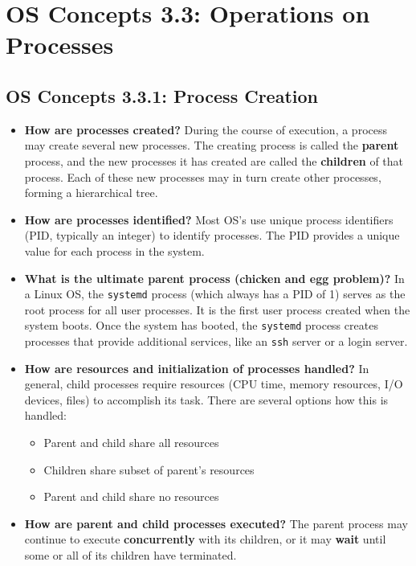 \documentclass[12pt]{article}
\begin{document}
\section*{OS Concepts 3.3: Operations on Processes}

\subsection*{OS Concepts 3.3.1: Process Creation}

\begin{itemize}
    \item \textbf{How are processes created?} During the course of execution, a process may create several new processes. The creating process is called the \textbf{parent} process, and the new processes it has created are called the \textbf{children} of that process. Each of these new processes may in turn create other processes, forming a hierarchical tree.
    \item \textbf{How are processes identified?} Most OS's use unique process identifiers (PID, typically an integer) to identify processes. The PID provides a unique value for each process in the system.
    \item \textbf{What is the ultimate parent process (chicken and egg problem)?} In a Linux OS, the \texttt{systemd} process (which always has a PID of 1) serves as the root process for all user processes. It is the first user process created when the system boots. Once the system has booted, the \texttt{systemd} process creates processes that provide additional services, like an \texttt{ssh} server or a login server.
    \item \textbf{How are resources and initialization of processes handled?} In general, child processes require resources (CPU time, memory resources, I/O devices, files) to accomplish its task. There are several options how this is handled:
        \begin{itemize}
            \item Parent and child share all resources
            \item Children share subset of parent's resources
            \item Parent and child share no resources
        \end{itemize}
    \item \textbf{How are parent and child processes executed?} The parent process may continue to execute \textbf{concurrently} with its children, or it may \textbf{wait} until some or all of its children have terminated.

\end{itemize}
\end{document}
